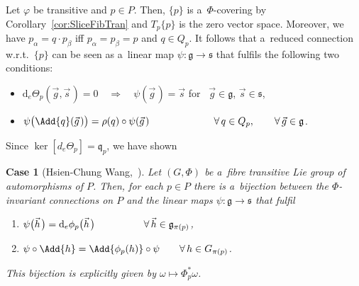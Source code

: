 \documentclass[pdftex]{sigma}
\numberwithin{equation}{section}
\newtheorem{scase}[Theorem]{Case}
{\theoremstyle{definition}
\newtheorem{Definition}[Theorem]{Definition}
\newtheorem{Convention}[Theorem]{Convention}
\newtheorem{Example}[Theorem]{Example}
\newtheorem{Remark}[Theorem]{Remark}
}
\begin{document}
Let $\varphi$ be transitive and $p\in P$.
Then, $\{p\}$ is a~$\Phi$-covering by Corollary~\ref{cor:SliceFibTran} and $T_p\{p\}$ is the zero vector space.
Moreover, we have $p_\alpha=q\cdot p_\beta$ if\/f $p_\alpha=p_\beta=p$ and $q\in Q_p$.
It follows that a~reduced connection w.r.t.~$\{p\}$ can be seen as a~linear map $\psi\colon\mathfrak{g}\rightarrow
\mathfrak{s}$ that fulf\/ils the following two conditions:{\samepage
\begin{itemize}\itemsep=0pt
\item
$\mathrm{d}_e\Theta_p(\vec{g},\vec{s}\hspace{1pt})=0
\quad
\Longrightarrow
\quad
\psi(\vec{g}\hspace{1pt})=\vec{s}$
\qquad
for \  $\vec{g}\in \mathfrak{g}$, $\vec{s}\in \mathfrak{s}$,
\item
$\psi\big(\Add{q}(\vec{g}\hspace{1pt})\big)=\rho(q)\circ \psi(\vec{g}\hspace{1pt})
\hspace*{23mm}\forall\, q\in Q_p,
\qquad\forall\, \vec{g}\in \mathfrak{g}$.
\end{itemize}}

Since $\ker[d_e\Theta_p]=\mathfrak{q}_p$, we have shown
\begin{scase}[Hsien-Chung Wang,~\cite{Wang}]
\label{th:wang}
Let $(G,\Phi)$ be a~fibre transitive Lie group of automorphisms of $P$.
Then, for each $p\in P$ there is a~bijection between the $\Phi$-invariant connections on $P$ and the linear maps
$\psi\colon \mathfrak{g}\rightarrow \mathfrak{s}$ that fulfil
\begin{enumerate}\itemsep=0pt
\item[\rm a)]
$\psi\big(\vec{h}\hspace{1pt}\big)=\mathrm{d}_e\phi_p\big(\vec{h}\hspace{1pt}\big)\hspace*{17.4mm}\forall\, \vec{h}\in \mathfrak{g}_{\pi(p)}$,
\item[\rm b)] $\psi\circ\Add{h}=\Add{\phi_p(h)}\circ \psi\qquad\forall\, h\in G_{\pi(p)}$.
\end{enumerate}
This bijection is explicitly given by $\omega\mapsto
\Phi_p^{*}\omega$.
\end{scase}
\end{document}
